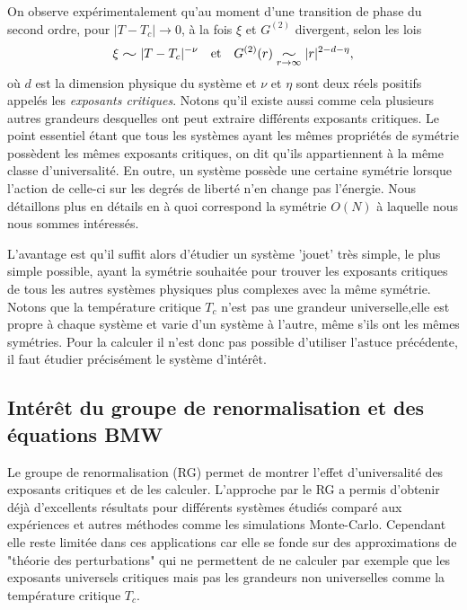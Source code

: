 \documentclass[10pt]{article}
\newcommand{\widesim}[2][1.5]{
  \mathrel{\underset{#2}{\scalebox{#1}[1]{$\sim$}}}
  }
\begin{document}
\begin{multicols}{2}
On observe expérimentalement qu'au moment d'une transition de phase du second ordre, pour $|T-T_c| \rightarrow 0$, à la fois $\xi$ et $G^{(2)}$ divergent, selon les lois 
\begin{equation}
	\xi \widesim{} |T-T_c|^{-\nu} 	\quad \text{et} \quad G^{(2)}(r) \widesim{r \to \infty} |r|^{2-d-\eta},
\end{equation}
où $d$ est la dimension physique du système et $\nu$ et $\eta$ sont deux réels positifs appelés les \emph{exposants critiques}. Notons qu'il existe aussi comme cela plusieurs autres grandeurs desquelles ont peut extraire différents exposants critiques. Le point essentiel étant que tous les systèmes ayant les mêmes propriétés de symétrie possèdent les mêmes exposants critiques, on dit qu'ils appartiennent à la même classe d'universalité. En outre, un système possède une certaine symétrie lorsque l'action de celle-ci sur les degrés de liberté n'en change pas l'énergie. Nous détaillons plus en détails en  à quoi correspond la symétrie $O(N)$ à laquelle nous nous sommes intéressés. 

L'avantage est qu'il suffit alors d'étudier un système 'jouet' très simple, le plus simple possible, ayant la symétrie souhaitée pour trouver les exposants critiques de tous les autres systèmes physiques plus complexes avec la même symétrie. Notons que la température critique $T_c$ n'est pas une grandeur universelle,elle est propre à chaque système et varie d'un système à l'autre, même s'ils ont les mêmes symétries. Pour la calculer il n'est donc pas possible d'utiliser l'astuce précédente, il faut étudier précisément le système d'intérêt.


\subsection{Intérêt du groupe de renormalisation et des équations BMW}

Le groupe de renormalisation (RG) permet de montrer l'effet d'universalité des exposants critiques et de les calculer. L'approche par le RG a permis d'obtenir déjà d'excellents résultats \cite{kadanoff1967scaling, wilson1971renormalization2} pour différents systèmes étudiés comparé aux expériences et autres méthodes comme les simulations Monte-Carlo. Cependant elle reste limitée dans ces applications car elle se fonde sur des approximations de "théorie des perturbations" qui ne permettent de ne calculer par exemple que les exposants universels critiques mais pas les grandeurs non universelles comme la température critique $T_c$.\\


\end{multicols}
\end{document}
